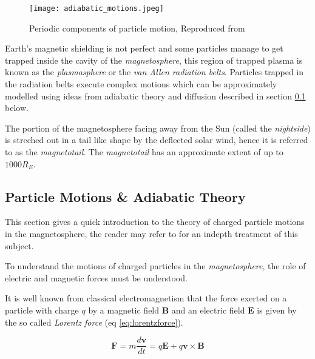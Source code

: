 \begin{wrapfigure}{r}{0.4\textwidth}
    \centering\texttt{[image: adiabatic\_motions.jpeg]}
    \caption{
        \small{Periodic components of particle motion, Reproduced from \citet{roederer2012dynamics}}}
    \label{fig:particlemotions}
\end{wrapfigure}


Earth's magnetic shielding is not perfect and some particles manage to get trapped inside the cavity of the 
\emph{magnetosphere}, this region of trapped plasma is known as the \emph{plasmasphere} or the \emph{van Allen 
radiation belts}. Particles trapped in the radiation belts execute complex motions which can be approximately 
modelled using ideas from adiabatic theory and diffusion described in section \ref{sec:plasmadiff} below. 

The portion of the magnetosphere facing away from the Sun (called the \emph{nightside}) is streched out in  
a tail like shape by the deflected solar wind, hence it is referred to as the \emph{magnetotail}. The 
\emph{magnetotail} has an approximate extent of up to $1000R_E$.


\subsection{Particle Motions \& Adiabatic Theory} \label{sec:plasmadiff}

This section gives a quick introduction to the theory of charged particle motions in the magnetosphere, the reader 
may refer to \citet{roederer2012dynamics} for an indepth treatment of this subject.

To understand the motions of charged particles in the \emph{magnetosphere}, the role of electric and magnetic 
forces must be understood.

It is well known from classical electromagnetism that the force exerted on a particle with charge $q$ by a 
magnetic field $\mathbf{B}$ and an electric field $\mathbf{E}$ is given by the so called \emph{Lorentz force} 
(eq \ref{eq:lorentzforce}).

\begin{equation}\label{eq:lorentzforce}
    \mathbf{F} = m\frac{d\mathbf{v}}{dt} = q\mathbf{E} + q\mathbf{v} \times \mathbf{B}
\end{equation}


